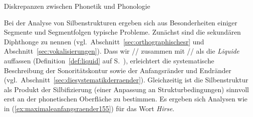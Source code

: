 
\begin{Vertiefung}{Diskrepanzen zwischen Phonetik und Phonologie}


\noindent Bei der Analyse von Silbenstrukturen ergeben sich aus Besonderheiten einiger Segmente und Segmentfolgen typische Probleme.
Zunächst sind die sekundären Diphthonge zu nennen (vgl.\ Abschnitt~\ref{sec:orthographischesr} und Abschnitt~\ref{sec:vokalisierungen}).
Dass wir // zusammen mit // als die \textit{Liquide} auffassen (Definition~\ref{def:liquid} auf S.\ \pageref{def:liquid}), erleichtert die systematische Beschreibung der Sonoritätskontur sowie der Anfangsränder und Endränder (vgl.\ Abschnitt~\ref{sec:diesystematikderraender}).
Gleichzeitig ist die Silbenstruktur als Produkt der Silbifizierung (einer Anpassung an Strukturbedingungen) sinnvoll erst an der phonetischen Oberfläche zu bestimmen.
Es ergeben sich Analysen wie in (\ref{ex:maximaleanfangsraender155}) für das Wort \textit{Hirse}.

\begin{exe}
\end{exe}


\end{Vertiefung}
